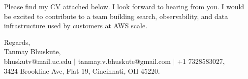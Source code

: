 \documentclass[11pt]{letter}
\begin{document}
\begin{letter}{}
Please find my CV attached below. I look forward to hearing from you. I would be excited to contribute to a team building search, observability, and data infrastructure used by customers at AWS scale.

{\setlength{\parskip}{0pt}
Regards,\\
Tanmay Bhuskute,\\
bhuskutv@mail.uc.edu $\mid$ tanmay.v.bhuskute@gmail.com $\mid$ +1 7328583027,\\
3424 Brookline Ave, Flat 19, Cincinnati, OH 45220.
}

\end{letter}
\end{document}
